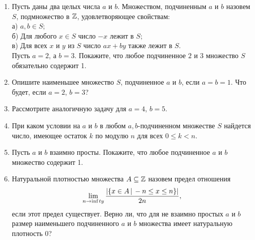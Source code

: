 \begin{enumerate}
\item Пусть даны два целых числа $a$ и $b$. Множеством, подчиненным $a$ и $b$ назовем $S$, подмножество в $\mathbb{Z}$, удовлетворяющее свойствам:\\
а) $a,b\in S$; \\
б) Для любого $x\in S$ число $-x$ лежит в $S$; \\
в) Для всех $x$ и $y$ из $S$ число $ax+by$ также лежит в $S$.\\
Пусть $a=2$, а $b=3$. Покажите, что любое подчиненное $2$ и $3$ множество $S$ обязательно содержит 1.
\item Опишите наименьшее множество $S$, подчиненное $a$ и $b$, если $a=b=1$. Что будет, если $a=2$, $b=3$?
\item Рассмотрите аналогичную задачу для $a=4$, $b=5$.
\item При каком условии на $a$ и $b$ в любом $a,b$-подчиненном множестве $S$ найдется число, имеющее остаток $k$ по модулю $n$ для всех $0 \leq k<n$.
\item Пусть $a$ и $b$ взаимно просты. Покажите, что любое подчиненное $a$ и $b$ множество содержит 1.
\item Натуральной плотностью множества $A\subseteq \mathbb{Z}$ назовем предел отношения 
$$ \lim_{n\to \text{inf\,}ty}\frac{|\{x\in A\,|\, -n\leq x\leq n\}|}{2n},$$ 
если этот предел существует. Верно ли, что для не взаимно простых $a$ и $b$ размер наименьшего подчиненного $a$ и $b$ множества имеет натуральную плотность 0?
\end{enumerate}


